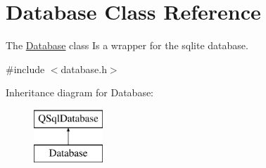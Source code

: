 \hypertarget{class_database}{}\section{Database Class Reference}
\label{class_database}


The \hyperlink{class_database}{Database} class Is a wrapper for the sqlite database.  




{\ttfamily \#include $<$database.\+h$>$}

Inheritance diagram for Database\+:\begin{figure}[H]
\begin{center}
\leavevmode
\includegraphics[height=2.000000cm]{class_database}
\end{center}
\end{figure}
